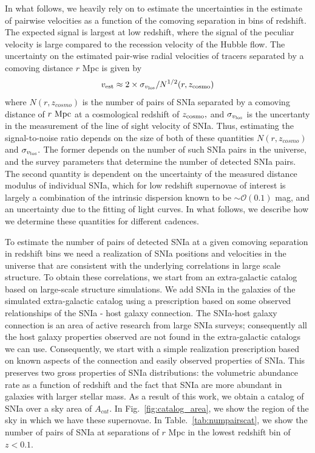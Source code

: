 \documentclass[a4paper,10pt]{article}
\begin{document}
In what follows, we heavily rely on \cite{2011PhRvD..83d3004B} to estimate the uncertainties in the estimate of pairwise velocities as a function of the comoving separation in bins of redshift. The expected signal is largest at low redshift, where the signal of the peculiar velocity is large compared to the recession velocity of the Hubble flow.  The uncertainty on the estimated pair-wise radial velocities of tracers separated by a comoving distance $r$ Mpc is given by
\begin{equation}
v_{\rm{est}} \approx 2 \times \sigma_{v_{\rm{los}}} / N^{1/2}(r, z_{\rm{cosmo}})
\end{equation}
where $N(r,z_{cosmo})$ is the number of pairs of SNIa separated by a comoving distance of $r~\rm{Mpc}$
at a cosmological redshift of $z_{\rm{cosmo}},$ and $\sigma_{v_{\rm{los}}}$ is the uncertanty in the
measurement of the line of sight velocity of SNIa. Thus, estimating the signal-to-noise ratio depends on the size of both of these quantities $N(r, z_{cosmo})$ and $\sigma_{v_{\rm{los}}}.$ The former depends on the number of such SNIa pairs in the universe, and the survey parameters that determine the number of detected SNIa pairs. The second quantity is dependent on the uncertainty of the measured distance modulus of individual SNIa, which for low redshift supernovae of interest is largely a combination of the intrinsic dispersion known to be $\sim \mathcal{O}(0.1)$ mag, and an uncertainty due to the fitting of light curves. In what follows, we describe how we determine these quantities for different cadences. 

To estimate the number of pairs of detected SNIa at a given comoving separation in redshift bins we need a realization of SNIa positions and velocities in the universe that are consistent with the underlying correlations in large scale structure. To obtain these correlations, we start from an extra-galactic catalog based on large-scale structure simulations. We add SNIa in the galaxies of the simulated extra-galactic catalog using a prescription based on some observed relationships of the SNIa - host galaxy connection. The SNIa-host galaxy connection is an area of active research from large SNIa surveys; consequently all the host galaxy properties observed are not found in the extra-galactic catalogs we can use. Consequently, we start with a simple realization prescription based on known aspects of the connection and easily observed properties of SNIa. This preserves two gross properties of SNIa distributions: the volumetric abundance rate as a function of redshift and the fact that SNIa are more abundant in galaxies with larger stellar mass. As a result of this work, we obtain a catalog of SNIa over a sky area of $A_{cat}.$ In Fig.~\ref{fig:catalog_area}, we show the region of the sky in which we have these supernovae. In Table.~\ref{tab:numpairscat}, we show the number of pairs of SNIa at separations of $r$ Mpc in the lowest redshift bin of $z < 0.1.$
\end{document}
